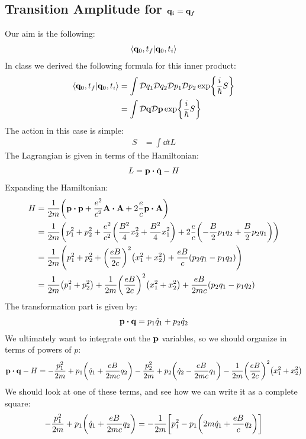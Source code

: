 \documentclass[12pt]{article}
\newcommand{\cD}{\mathcal{D}}
\newcommand{\q}{\vb{q}}
\newcommand{\p}{\vb{p}}
\begin{document}
\subsection{Transition Amplitude for $\vb{q}_i=\vb{q}_f$}
Our aim is the following:
\begin{align*}
  \ip{\q_0,t_f}{\q_0,t_i}
\end{align*}
In class we derived the following formula for this inner product:
\begin{align*}
  \ip{\q_0,t_f}{\q_0,t_i}&=\int\cD q_1\cD q_2\cD p_1\cD p_2
  \exp{\frac{i}{\hbar}S}\\
  &=\int\cD\q\cD\p\exp{\frac{i}{\hbar}S}
\end{align*}
The action in this case is simple:
\begin{align*}
  S&=\int\dd{t}L
\end{align*}
The Lagrangian is given in terms of the Hamiltonian:
\begin{align*}
  L=\p\vdot\dot{\q}-H
\end{align*}
Expanding the Hamiltonian:
\begin{align*}
  H&=\frac{1}{2m}\qty(\p\vdot\p+\frac{e^2}{c^2}\vb{A\vdot A}+
  2\frac{e}{c}\p\vdot\vb{A})\\
  &=\frac{1}{2m}\qty(p_1^2+p_2^2+
  \frac{e^2}{c^2}\qty(\frac{B^2}{4}x_2^2+\frac{B^2}{4}x_1^2)+
  2\frac{e}{c}\qty(-\frac{B}{2}p_1q_2+\frac{B}{2}p_2q_1))\\
  &=\frac{1}{2m}\qty(p_1^2+p_2^2+\qty(\frac{eB}{2c})^2\qty(x_1^2+x_2^2)
  +\frac{eB}{c}\qty(p_2q_1-p_1q_2))\\
  &=\frac{1}{2m}\qty(p_1^2+p_2^2)
  +\frac{1}{2m}\qty(\frac{eB}{2c})^2\qty(x_1^2+x_2^2)
  +\frac{eB}{2mc}\qty(p_2q_1-p_1q_2)
\end{align*}
The transformation part is given by:
\begin{align*}
  \p\vdot\q=p_1\dot{q}_1+p_2\dot{q}_2
\end{align*}
We ultimately want to integrate out the $\p$ variables, so we should organize in terms of powers of $p$:
\begin{align*}
  \p\vdot\q-H=-\frac{p_1^2}{2m}+p_1\qty(\dot{q}_1+\frac{eB}{2mc}q_2)
  -\frac{p_2^2}{2m}+p_2\qty(\dot{q}_2-\frac{eB}{2mc}q_1)
  -\frac{1}{2m}\qty(\frac{eB}{2c})^2\qty(x_1^2+x_2^2)
\end{align*}
We should look at one of these terms, and see how we can write it as a complete square:
\begin{align*}
  -\frac{p_1^2}{2m}+p_1\qty(\dot{q}_1+\frac{eB}{2mc}q_2)=
  -\frac{1}{2m}\qty[p_1^2-p_1\qty(2m\dot{q}_1+\frac{eB}{c}q_2)]
\end{align*}
\end{document}
